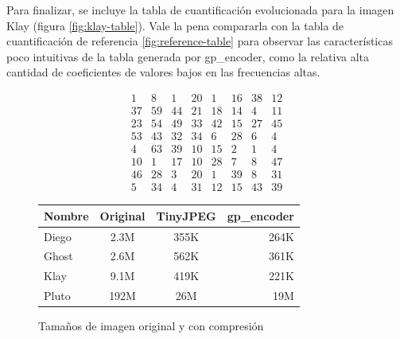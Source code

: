 Para finalizar, se incluye la tabla de cuantificación evolucionada para la
imagen Klay (figura \ref{fig:klay-table}). Vale la pena compararla con la tabla de
cuantificación de referencia \ref{fig:reference-table} para observar las
características poco intuitivas de la tabla generada por gp\_encoder, como la
relativa alta cantidad de coeficientes de valores bajos en las frecuencias
altas.


\begin{equation}
    \begin{matrix}
        1  &   8  &  1  & 20  &  1  & 16  & 38  & 12 \\
        37 &   59 &  44 &  21 &  18 &  14 &   4 &  11 \\
        23 &   54 &  49 &  33 &  42 &  15 &  27 &  45 \\
        53 &   43 &  32 &  34 &   6 &  28 &   6 &   4 \\
        4  &  63  & 39  & 10  & 15  &  2  &  1  &  4 \\
        10 &    1 &  17 &  10 &  28 &   7 &   8 &  47 \\
        46 &   28 &   3 &  20 &   1 &  39 &   8 &  31 \\
        5  &  34  &  4  & 31  & 12  & 15  & 43  & 39
    \end{matrix}
    \label{fig:klay-table}
\end{equation}

\begin{figure}[h]
    \begin{tabular}{|l c c r|}
        \hline
        Nombre & Original & TinyJPEG & gp\_encoder \\
        \hline
        Diego & 2.3M & 355K & 264K \\
        Ghost & 2.6M & 562K & 361K \\
        Klay  & 9.1M & 419K & 221K \\
        Pluto & 192M & 26M  & 19M  \\
        \hline
    \end{tabular}
    \caption{Tamaños de imagen original y con compresión}
    \label{fig:size-table}
\end{figure}


